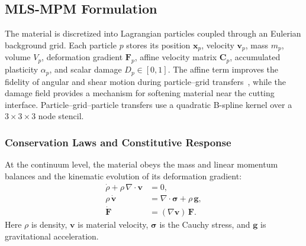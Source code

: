 \subsection{MLS-MPM Formulation}
\label{subsec:cut_mpm}

The material is discretized into Lagrangian particles coupled through an Eulerian background grid. Each particle $p$ stores its position $\mathbf{x}_p$, velocity $\mathbf{v}_p$, mass $m_p$, volume $V_p$, deformation gradient $\mathbf{F}_p$, affine velocity matrix $\mathbf{C}_p$, accumulated plasticity $\alpha_p$, and scalar damage $D_p\in[0,1]$. The affine term improves the fidelity of angular and shear motion during particle--grid transfers~\citep{jiang2017angular}, while the damage field provides a mechanism for softening material near the cutting interface. Particle--grid--particle transfers use a quadratic B-spline kernel over a $3\times3\times3$ node stencil.

\subsubsection{Conservation Laws and Constitutive Response}
At the continuum level, the material obeys the mass and linear momentum balances and the kinematic evolution of its deformation gradient:
\begin{subequations}\label{eq:gov}
\begin{align}
  \dot{\rho}+\rho\,\nabla\!\cdot\!\mathbf{v} &= 0, \label{eq:gov_mass}\\
  \rho\,\dot{\mathbf{v}} &= \nabla\!\cdot\!\boldsymbol{\sigma}+\rho\,\mathbf{g}, \label{eq:gov_mom}\\
  \dot{\mathbf{F}} &= (\nabla\mathbf{v})\,\mathbf{F}. \label{eq:gov_kin}
\end{align}
\end{subequations}
Here $\rho$ is density, $\mathbf{v}$ is material velocity, $\boldsymbol{\sigma}$ is the Cauchy stress, and $\mathbf{g}$ is gravitational acceleration.

